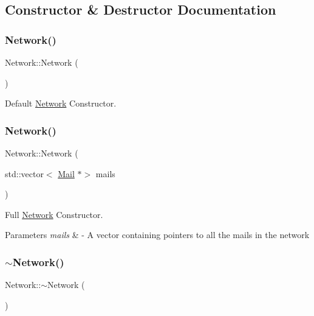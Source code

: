 \subsection{Constructor \& Destructor Documentation}
\mbox{\label{classNetwork_a3cc2fb4f8fa4d507077e8da85ce5a1c8}} 
\subsubsection{\texorpdfstring{Network()}{Network()}\hspace{0.1cm}{\footnotesize\ttfamily [1/2]}}
{\footnotesize\ttfamily Network\+::\+Network (\begin{DoxyParamCaption}{ }\end{DoxyParamCaption})}



Default \mbox{\hyperlink{classNetwork}{Network}} Constructor. 

\mbox{\label{classNetwork_a6c20a000b0a40b33b39b26874a4d50dd}} 
\subsubsection{\texorpdfstring{Network()}{Network()}\hspace{0.1cm}{\footnotesize\ttfamily [2/2]}}
{\footnotesize\ttfamily Network\+::\+Network (\begin{DoxyParamCaption}\item[{std\+::vector$<$ \mbox{\hyperlink{classMail}{Mail}} $\ast$$>$}]{mails }\end{DoxyParamCaption})}



Full \mbox{\hyperlink{classNetwork}{Network}} Constructor. 


\begin{DoxyParams}{Parameters}
{\em mails} & -\/ A vector containing pointers to all the mails in the network \\
\hline
\end{DoxyParams}
\mbox{\label{classNetwork_a7a4e19cdb4bf0c7ecf82baa643831492}} 
\subsubsection{\texorpdfstring{$\sim$\+Network()}{~Network()}}
{\footnotesize\ttfamily Network\+::$\sim$\+Network (\begin{DoxyParamCaption}{ }\end{DoxyParamCaption})\hspace{0.3cm}{\ttfamily [virtual]}}



